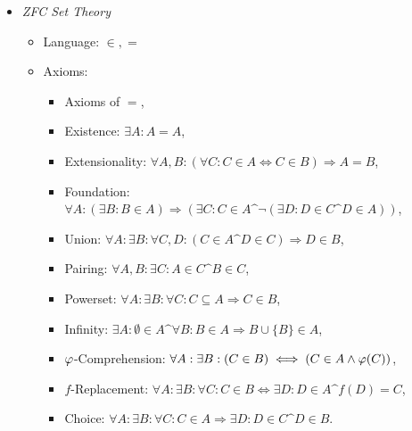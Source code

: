 \documentclass{amsart}
\newcommand{\imp}{\Rightarrow}
\begin{document}
\begin{itemize}
\begin{itemize}
\begin{itemize}
				\item $B(a,b,a) \imp a=b$,
				\item Pasch's Axiom: $B(a,b,c) \^ B(a,d,e) \imp \exists x: B(b,x,e) \^ B(c,x,d)$,
				\item $\ph,\psi$-Continuity: $(\exists a: \forall x,y: (\ph(x) \^ \psi(y)) \imp B(a,x,y))\imp (\exists b: \forall x,y: (\ph(x)\^ \psi(y)) \imp B(x,b,y))$
				\item Dimension $\geq 2$: $\exists a,b,c: (\neg B(a,b,c) \^ \neg B(b,c,a) \^ \neg B(c,a,b))$,
				\item Dimension $\leq 2$: $\neg (\text{Dimension} \geq 3)$,
				\item Parallel Postulate: \textbf{not done},
				\item 
			\end{itemize}
		\end{itemize}
		\item \textit{ZFC Set Theory}
		\begin{itemize}
			\item Language: $\in, =$
			\item Axioms:
			\begin{itemize}
				\item Axioms of $=$,
				\item Existence: $\exists A: A=A$,
				\item Extensionality: $\forall A,B: (\forall C: C\in A \iff C\in B)\imp A=B$,
				\item Foundation: $\forall A: (\exists B: B \in A) \imp (\exists C: C\in A \^ \neg (\exists D: D\in C \^ D\in A))$,
				\item Union: $\forall A: \exists B: \forall C,D: (C\in A \^ D\in C) \imp D\in B$,
				\item Pairing: $\forall A,B: \exists C: A\in C \^ B\in C$,
				\item Powerset: $\forall A: \exists B: \forall C: C\subseteq A \imp C\in B$,
				\item Infinity: $\exists A: \emptyset \in A \^ \forall B: B\in A \imp B\cup \{B\} \in A$,
				\item $\varphi$-Comprehension: $\forall A: \exists B: (C\in B) \iff (C\in A \wedge\varphi(C))$,
				\item $f$-Replacement: $\forall A: \exists B: \forall C: C\in B \iff \exists D: D\in A \^ f(D) = C$,
				\item Choice: $\forall A: \exists B: \forall C: C\in A \imp \exists D: D\in C \^ D\in B$.
			\end{itemize}
		\end{itemize}
	\end{itemize}
\end{document}
